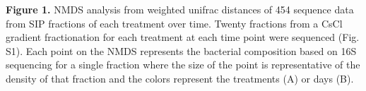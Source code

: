 \textbf{Figure 1.} NMDS analysis from weighted unifrac distances of 454 sequence data from SIP fractions of each treatment over time. Twenty fractions from a CsCl gradient fractionation for each treatment at each time point were sequenced (Fig. S1). Each point on the NMDS represents the bacterial composition based on 16S sequencing for a single fraction where the size of the point is representative of the density of that fraction and the colors represent the treatments (A) or days (B). 